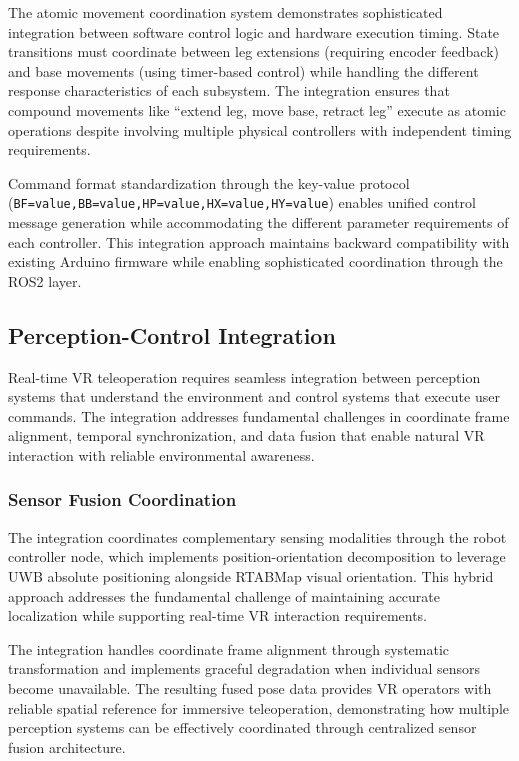 The atomic movement coordination system demonstrates sophisticated integration between software control logic and hardware execution timing. State transitions must coordinate between leg extensions (requiring encoder feedback) and base movements (using timer-based control) while handling the different response characteristics of each subsystem. The integration ensures that compound movements like ``extend leg, move base, retract leg'' execute as atomic operations despite involving multiple physical controllers with independent timing requirements.

Command format standardization through the key-value protocol (\texttt{BF=value,BB=value,HP=value,HX=value,HY=value}) enables unified control message generation while accommodating the different parameter requirements of each controller. This integration approach maintains backward compatibility with existing Arduino firmware while enabling sophisticated coordination through the ROS2 layer.

\subsection{Perception-Control Integration}

Real-time VR teleoperation requires seamless integration between perception systems that understand the environment and control systems that execute user commands. The integration addresses fundamental challenges in coordinate frame alignment, temporal synchronization, and data fusion that enable natural VR interaction with reliable environmental awareness.

\subsubsection{Sensor Fusion Coordination}

The integration coordinates complementary sensing modalities through the robot controller node, which implements position-orientation decomposition to leverage UWB absolute positioning alongside RTABMap visual orientation. This hybrid approach addresses the fundamental challenge of maintaining accurate localization while supporting real-time VR interaction requirements.

The integration handles coordinate frame alignment through systematic transformation and implements graceful degradation when individual sensors become unavailable. The resulting fused pose data provides VR operators with reliable spatial reference for immersive teleoperation, demonstrating how multiple perception systems can be effectively coordinated through centralized sensor fusion architecture.

